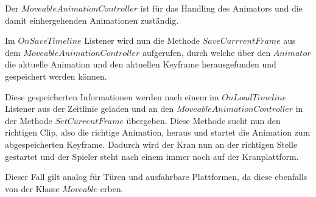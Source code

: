 Der $MoveableAnimationController$ ist für das Handling des Animators und die damit einhergehenden Animationen zuständig.

Im $OnSaveTimeline$ Listener wird nun die Methode $SaveCurrrentFrame$ aus dem $MoveableAnimationController$ aufgerufen, durch welche über den $Animator$ die aktuelle Animation und den aktuellen Keyframe herausgefunden und gespeichert werden können.

Diese gespeicherten Informationen werden nach einem  im $OnLoadTimeline$ Listener aus der Zeitlinie geladen und an den $MoveableAnimationController$ in der Methode $SetCurrentFrame$ übergeben. Diese Methode sucht nun den richtigen Clip, also die richtige Animation, heraus und startet die Animation zum abgespeicherten Keyframe.
Dadurch wird der Kran nun an der richtigen Stelle gestartet und der Spieler steht nach einem  immer noch auf der Kranplattform.

Dieser Fall gilt analog für Türen und ausfahrbare Plattformen, da diese ebenfalls von der Klasse $Moveable$ erben.

